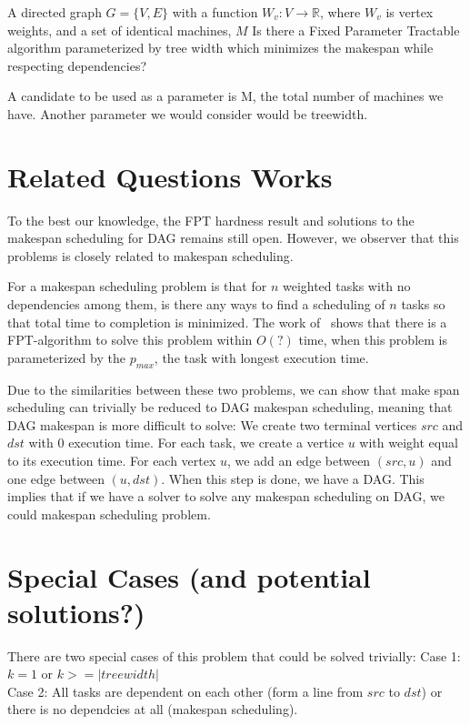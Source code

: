 \documentclass{article}
\begin{document}
%
{A directed graph $G = \{V, E\}$ with a function $W_v: V \to \mathbb{R}$,
 where $W_v$ is vertex weights, and a set of identical machines,
$M$}%
{}%
{Is there a Fixed Parameter Tractable algorithm parameterized by tree width
which  minimizes the makespan while respecting
dependencies?}%

A candidate to be used as a parameter is M, the total number of machines
we have. Another parameter we would consider would be treewidth.

\section{Related Questions Works}
To the best our knowledge, the FPT hardness result and solutions to the 
makespan scheduling for DAG remains still open. 
However, we observer that this problems is closely related to makespan scheduling.

For a makespan scheduling problem is that for $n$ weighted tasks with no
dependencies among them, is there any ways to find a scheduling of $n$
tasks so that total time to completion is minimized. The work of~\cite{mnich2015scheduling}
shows that there is a FPT-algorithm to solve this problem within $O(?)$ time,
when this problem is parameterized by the $p_{max}$, the task with longest
execution time.

Due to the similarities between these two problems, we can show that make
span scheduling can trivially be reduced to DAG makespan scheduling, meaning
that DAG makespan is more difficult to solve:
We create two terminal vertices $src$ and $dst$ with 0 execution time. For each
task, we create a vertice $u$ with weight equal to its execution time. For each
vertex $u$, we add an edge between $(src,u)$ and one edge between $(u,dst)$. 
When this step is done, we have a DAG. 
This implies that if we have a solver to solve any makespan
scheduling on DAG, we could makespan scheduling problem. 

\section{Special Cases (and potential solutions?)}
There are two special cases of this problem that could be solved trivially:
Case 1: $k = 1$ or $k >= |treewidth|$ \\
Case 2: All tasks are dependent on each other (form a line from $src$ to $dst$) 
or there is no dependcies at all (makespan scheduling).



\end{document}
